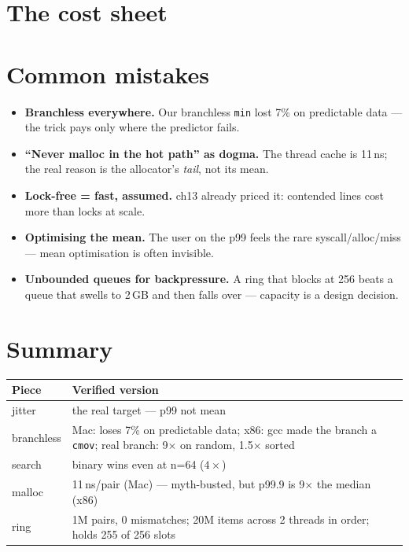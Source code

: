 \section{The cost sheet}


\section{Common mistakes}
\begin{itemize}
\item \textbf{Branchless everywhere.} Our branchless \texttt{min}
      lost 7\% on predictable data --- the trick pays only where
      the predictor fails.
\item \textbf{``Never malloc in the hot path'' as dogma.} The
      thread cache is 11\,ns; the real reason is the allocator's
      \emph{tail}, not its mean.
\item \textbf{Lock-free = fast, assumed.} ch13 already priced it:
      contended lines cost more than locks at scale.
\item \textbf{Optimising the mean.} The user on the p99 feels the
      rare syscall/alloc/miss --- mean optimisation is often
      invisible.
\item \textbf{Unbounded queues for backpressure.} A ring that
      blocks at 256 beats a queue that swells to 2\,GB and then
      falls over --- capacity is a design decision.
\end{itemize}

\section{Summary}
\begin{tabularx}{\linewidth}{@{}l X@{}}
\toprule
\textbf{Piece} & \textbf{Verified version} \\
\midrule
jitter   & the real target --- p99 not mean \\
branchless & Mac: loses 7\% on predictable data; x86: gcc made the branch a \texttt{cmov}; real branch: 9$\times$ on random, 1.5$\times$ sorted \\
search   & binary wins even at n=64 ($4\times$) \\
malloc   & 11\,ns/pair (Mac) --- myth-busted, but p99.9 is 9$\times$ the median (x86) \\
ring     & 1M pairs, 0 mismatches; 20M items across 2 threads in order; holds 255 of 256 slots \\
\bottomrule
\end{tabularx}

